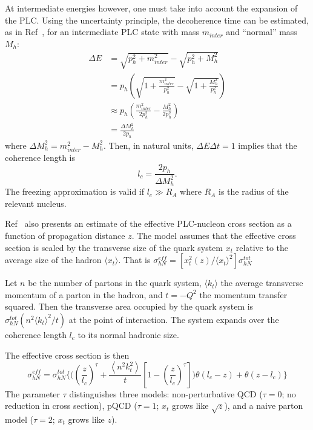 At intermediate energies however, one must take into account the expansion of
the PLC.
Using the uncertainty principle, the decoherence time can be
estimated, as in Ref~\cite{Farrar_1988}, for an intermediate PLC state with mass
$m_{inter}$ and ``normal'' mass $M_h$:
\begin{align}
    \Delta E &= \sqrt{p_h^2 + m_{inter}^2} - \sqrt{p_h^2 + M_h^2} \\
             &= p_h \left( \sqrt{1+\frac{m_{inter}^2}{p_h^2}} -
                           \sqrt{1+\frac{M_h^2}{p_h^2}} \right) \\
             &\approx p_h \left( \frac{m_{inter}^2}{2p_h^2} - \frac{M_h^2}{2p_h^2} \right) \\
             &= \frac{\Delta M_h^2}{2p_h}
\end{align}
where $\Delta M_h^2 = m_{inter}^2 - M_h^2$.
Then, in natural units, $\Delta E \Delta t = 1$ implies that the coherence
length is
\begin{equation}
    l_c = \frac{2p_h}{\Delta M_h^2}.
\end{equation}
The freezing approximation is valid if $l_c \gg R_A$ where $R_A$ is the radius of
the relevant nucleus.


Ref~\cite{Farrar_1988} also presents an estimate of the effective PLC-nucleon
cross section as a function of propagation distance $z$.
The model assumes that the effective cross section is scaled by the transverse
size of the quark system $x_t$ relative to the average size of the hadron
$\langle x_t \rangle$.
That is
$\sigma^{eff}_{hN} = \left[ x^2_t(z) / \langle x_t \rangle^2 \right] \sigma^{tot}_{hN}$


Let $n$ be the number of partons in the quark system,
$\langle k_t \rangle$ the average transverse momentum of a parton in the
hadron, and $t=-Q^2$ the momentum transfer squared.
Then the transverse area occupied by the quark system is
$\sigma^{tot}_{hN}(n^2 \langle k_t \rangle^2 / t)$ at the point of interaction.
The system expands over the coherence length $l_c$ to its normal hadronic size.


The effective cross section is then
\begin{equation}
    \sigma_{hN}^{eff} = \sigma_{hN}^{tot}
  \Bigg\{ %
        \Bigg(\left(\frac{z}{l_c}\right)^{\tau} +
               \frac{\left\langle n^{2} k_{t}^{2}\right\rangle}{t} \left[1-\left(\frac{z}{l_c}\right)^{\tau}\right]
        \Bigg)
        \theta\left(l_c-z\right) +
        \theta\left(z-l_c\right)
  \Bigg\}%
\end{equation}
The parameter $\tau$ distinguishes three models:
non-perturbative QCD ($\tau=0$; no reduction in cross section),
pQCD ($\tau=1$; $x_t$ grows like $\sqrt{z}$), and
a naive parton model ($\tau=2$; $x_t$ grows like $z$).


